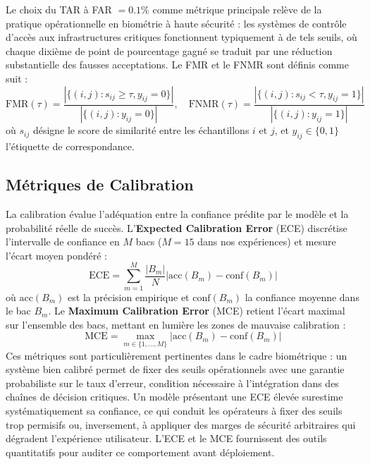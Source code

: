 \documentclass[12pt,a4paper]{report}
\begin{document}
Le choix du TAR \`{a} FAR $= 0.1\%$ comme m\'{e}trique principale rel\`{e}ve de la pratique op\'{e}rationnelle en biom\'{e}trie \`{a} haute s\'{e}curit\'{e} : les syst\`{e}mes de contr\^{o}le d'acc\`{e}s aux infrastructures critiques fonctionnent typiquement \`{a} de tels seuils, o\`{u} chaque dixi\`{e}me de point de pourcentage gagn\'{e} se traduit par une r\'{e}duction substantielle des fausses acceptations. Le FMR et le FNMR sont d\'{e}finis comme suit :
\begin{equation}
    \text{FMR}(\tau) = \frac{|\{(i,j) : s_{ij} \geq \tau, y_{ij} = 0\}|}{|\{(i,j) : y_{ij} = 0\}|}, \quad
    \text{FNMR}(\tau) = \frac{|\{(i,j) : s_{ij} < \tau, y_{ij} = 1\}|}{|\{(i,j) : y_{ij} = 1\}|}
\end{equation}
o\`{u} $s_{ij}$ d\'{e}signe le score de similarit\'{e} entre les \'{e}chantillons $i$ et $j$, et $y_{ij} \in \{0, 1\}$ l'\'{e}tiquette de correspondance.

\subsection{M\'{e}triques de Calibration}

La calibration \'{e}value l'ad\'{e}quation entre la confiance pr\'{e}dite par le mod\`{e}le et la probabilit\'{e} r\'{e}elle de succ\`{e}s. L'\textbf{Expected Calibration Error} (ECE) discr\'{e}tise l'intervalle de confiance en $M$ bacs ($M = 15$ dans nos exp\'{e}riences) et mesure l'\'{e}cart moyen pond\'{e}r\'{e} :
\begin{equation}
    \text{ECE} = \sum_{m=1}^{M} \frac{|B_m|}{N} \left| \text{acc}(B_m) - \text{conf}(B_m) \right|
\end{equation}
o\`{u} $\text{acc}(B_m)$ est la pr\'{e}cision empirique et $\text{conf}(B_m)$ la confiance moyenne dans le bac $B_m$. Le \textbf{Maximum Calibration Error} (MCE) retient l'\'{e}cart maximal sur l'ensemble des bacs, mettant en lumi\`{e}re les zones de mauvaise calibration :
\begin{equation}
    \text{MCE} = \max_{m \in \{1, \ldots, M\}} \left| \text{acc}(B_m) - \text{conf}(B_m) \right|
\end{equation}
Ces m\'{e}triques sont particuli\`{e}rement pertinentes dans le cadre biom\'{e}trique : un syst\`{e}me bien calibr\'{e} permet de fixer des seuils op\'{e}rationnels avec une garantie probabiliste sur le taux d'erreur, condition n\'{e}cessaire \`{a} l'int\'{e}gration dans des cha\^{i}nes de d\'{e}cision critiques. Un mod\`{e}le pr\'{e}sentant une ECE \'{e}lev\'{e}e surestime syst\'{e}matiquement sa confiance, ce qui conduit les op\'{e}rateurs \`{a} fixer des seuils trop permisifs ou, inversement, \`{a} appliquer des marges de s\'{e}curit\'{e} arbitraires qui d\'{e}gradent l'exp\'{e}rience utilisateur. L'ECE et le MCE fournissent des outils quantitatifs pour auditer ce comportement avant d\'{e}ploiement.
\end{document}
